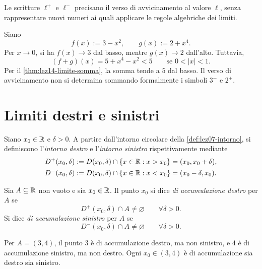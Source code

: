 Le scritture \(\ell^+\) e \(\ell^-\) precisano il verso
di avvicinamento al valore \(\ell\), senza rappresentare
nuovi numeri ai quali applicare le regole algebriche
dei limiti.

\begin{example}
\label{ex:lez14-verso-somma}
Siano
\[
  f(x):=3-x^2,
  \qquad g(x):=2+x^4.
\]
Per \(x\to0\), si ha \(f(x)\to3\) dal basso, mentre
\(g(x)\to2\) dall'alto. Tuttavia,
\[
  (f+g)(x)=5+x^4-x^2<5
  \qquad\text{se }0<|x|<1.
\]
Per il \cref{thm:lez14-limite-somma}, la somma tende
a \(5\) dal basso. Il verso di avvicinamento non si
determina sommando formalmente i simboli \(3^-\) e \(2^+\).
\end{example}

\section{Limiti destri e sinistri}
\label{sec:lez14-limiti-unilateri}

\begin{definition}
\label{def:lez14-intorni-unilateri}
Siano \(x_0\in\mathbb{R}\) e \(\delta>0\). A partire dall'intorno
circolare della \cref{def:lez07-intorno}, si definiscono
l'\emph{intorno destro} e l'\emph{intorno sinistro}
rispettivamente mediante
\[
\begin{aligned}
  D^+(x_0,\delta)
    &:=D(x_0,\delta)\cap\{x\in\mathbb{R}:x>x_0\}
      =(x_0,x_0+\delta),\\
  D^-(x_0,\delta)
    &:=D(x_0,\delta)\cap\{x\in\mathbb{R}:x<x_0\}
      =(x_0-\delta,x_0).
\end{aligned}
\]
\end{definition}

\begin{definition}
\label{def:lez14-accumulazione-unilaterale}
Sia \(A\subseteq\mathbb{R}\) non vuoto e sia \(x_0\in\mathbb{R}\).
Il punto \(x_0\) si dice \emph{di accumulazione destro}
per \(A\) se
\[
  D^+(x_0,\delta)\cap A\ne\varnothing
  \qquad\forall\delta>0.
\]
Si dice \emph{di accumulazione sinistro} per \(A\) se
\[
  D^-(x_0,\delta)\cap A\ne\varnothing
  \qquad\forall\delta>0.
\]
\end{definition}

\begin{example}
\label{ex:lez14-accumulazione-unilaterale}
Per \(A=(3,4)\), il punto \(3\) è di accumulazione
destro, ma non sinistro, e \(4\) è di accumulazione
sinistro, ma non destro. Ogni \(x_0\in(3,4)\) è di
accumulazione sia destro sia sinistro.
\end{example}

